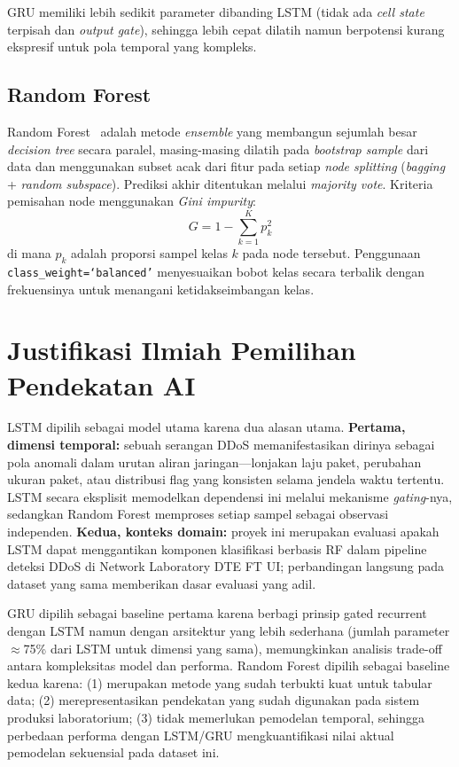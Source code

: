 \documentclass[11pt,a4paper,oneside]{report}
\begin{document}
GRU memiliki lebih sedikit parameter dibanding LSTM (tidak ada \textit{cell state} terpisah dan \textit{output gate}), sehingga lebih cepat dilatih namun berpotensi kurang ekspresif untuk pola temporal yang kompleks.

\subsection*{Random Forest}

Random Forest~\cite{breiman2001} adalah metode \textit{ensemble} yang membangun sejumlah besar \textit{decision tree} secara paralel, masing-masing dilatih pada \textit{bootstrap sample} dari data dan menggunakan subset acak dari fitur pada setiap \textit{node splitting} (\textit{bagging} + \textit{random subspace}). Prediksi akhir ditentukan melalui \textit{majority vote}. Kriteria pemisahan node menggunakan \textit{Gini impurity}:
\[
G = 1 - \sum_{k=1}^{K} p_k^2
\]
di mana $p_k$ adalah proporsi sampel kelas $k$ pada node tersebut. Penggunaan \texttt{class\_weight=`balanced'} menyesuaikan bobot kelas secara terbalik dengan frekuensinya untuk menangani ketidakseimbangan kelas.

\section{Justifikasi Ilmiah Pemilihan Pendekatan AI}

LSTM dipilih sebagai model utama karena dua alasan utama. \textbf{Pertama, dimensi temporal:} sebuah serangan DDoS memanifestasikan dirinya sebagai pola anomali dalam urutan aliran jaringan---lonjakan laju paket, perubahan ukuran paket, atau distribusi flag yang konsisten selama jendela waktu tertentu. LSTM secara eksplisit memodelkan dependensi ini melalui mekanisme \textit{gating}-nya, sedangkan Random Forest memproses setiap sampel sebagai observasi independen. \textbf{Kedua, konteks domain:} proyek ini merupakan evaluasi apakah LSTM dapat menggantikan komponen klasifikasi berbasis RF dalam pipeline deteksi DDoS di Network Laboratory DTE FT UI; perbandingan langsung pada dataset yang sama memberikan dasar evaluasi yang adil.

GRU dipilih sebagai baseline pertama karena berbagi prinsip gated recurrent dengan LSTM namun dengan arsitektur yang lebih sederhana (jumlah parameter $\approx$75\% dari LSTM untuk dimensi yang sama), memungkinkan analisis trade-off antara kompleksitas model dan performa. Random Forest dipilih sebagai baseline kedua karena: (1) merupakan metode yang sudah terbukti kuat untuk tabular data; (2) merepresentasikan pendekatan yang sudah digunakan pada sistem produksi laboratorium; (3) tidak memerlukan pemodelan temporal, sehingga perbedaan performa dengan LSTM/GRU mengkuantifikasi nilai aktual pemodelan sekuensial pada dataset ini.
\end{document}

